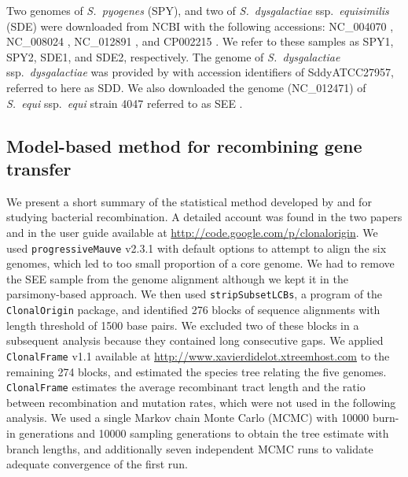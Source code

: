 \documentclass[english]{article}
\begin{document}
Two genomes of \textit{S.\ pyogenes} (SPY), and two of \textit{S.\ dysgalactiae}
ssp.\textit{\ equisimilis} (SDE) were downloaded from NCBI with the following
accessions: NC\_004070 \citep{Beres2002}, NC\_008024 \citep{Beres2006},
NC\_012891 \citep{Shimomura2011}, and CP002215 \citep{Suzuki2011}. We refer to
these samples as SPY1, SPY2, SDE1, and SDE2, respectively. The genome of
\textit{S.\ dysgalactiae} ssp.\textit{\ dysgalactiae} was provided by
\citet{Suzuki2011} with accession identifiers of SddyATCC27957, referred to here
as SDD. We also downloaded the genome (NC\_012471) of \textit{S.\ equi}
ssp.\textit{\ equi} strain 4047 referred to as SEE \citep{Holden2009}.

\subsection{Model-based method for recombining gene transfer}

We present a short summary of the statistical method developed by
\citet{Didelot2007} and \citet{Didelot2010} for studying bacterial
recombination. A detailed account was found in the two papers and in the user
guide available at \url{http://code.google.com/p/clonalorigin}.  We used
\texttt{progressiveMauve} v2.3.1 \citep{Darling2004,Darling2010} with default
options to attempt to align the six genomes, which led to too small proportion
of a core genome. We had to remove the SEE sample from the genome alignment
although we kept it in the parsimony-based approach.  We then used
\texttt{stripSubsetLCBs}, a program of the \texttt{ClonalOrigin} package, and
identified 276 blocks of sequence alignments with length threshold of 1500 base
pairs.  We excluded two of these blocks in a subsequent analysis because they
contained long consecutive gaps.  We applied \texttt{ClonalFrame} v1.1 available
at \url{http://www.xavierdidelot.xtreemhost.com} to the remaining 274 blocks,
and estimated the species tree relating the five genomes. \texttt{ClonalFrame}
estimates the average recombinant tract length and the ratio between
recombination and mutation rates, which were not used in the following analysis.
We used a single Markov chain Monte Carlo (MCMC) with 10000 burn-in generations
and 10000 sampling generations to obtain the tree estimate with branch lengths,
and additionally seven independent MCMC runs to validate adequate convergence of
the first run.
\end{document}
